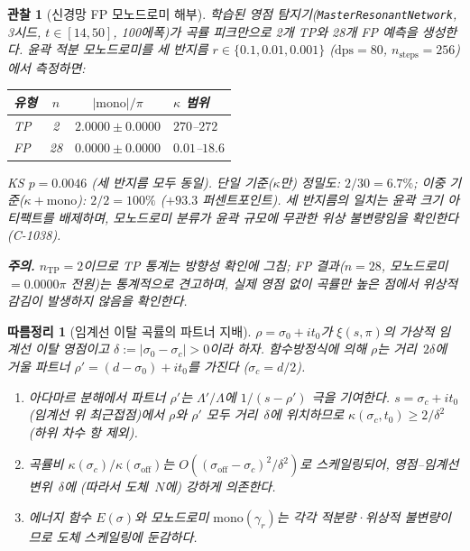 \documentclass[11pt, a4paper]{article}
\theoremstyle{definition}
\theoremstyle{plain}
\newtheorem{corollary}[theorem]{따름정리}
\newtheorem{observation}[theorem]{관찰}
\begin{document}
\begin{observation}[신경망 FP 모노드로미 해부]
\label{obs:nn_fp_mono}
학습된 영점 탐지기(\texttt{MasterResonantNetwork}, 3시드,
$t \in [14,50]$, 100에폭)가 곡률 피크만으로
2개 TP와 28개 FP 예측을 생성한다.
윤곽 적분 모노드로미를 세 반지름
$r \in \{0.1, 0.01, 0.001\}$
($\mathrm{dps}=80$, $n_{\mathrm{steps}} = 256$)에서 측정하면:
\begin{center}
\begin{tabular}{@{}lccl@{}}
\toprule
유형 & $n$ & $|\mathrm{mono}|/\pi$ & $\kappa$ 범위 \\
\midrule
TP & 2 & $2.0000 \pm 0.0000$ & $270$--$272$ \\
FP & 28 & $0.0000 \pm 0.0000$ & $0.01$--$18.6$ \\
\bottomrule
\end{tabular}
\end{center}
KS $p = 0.0046$ (세 반지름 모두 동일).
단일 기준($\kappa$만) 정밀도: $2/30 = 6.7\%$;
이중 기준($\kappa + \mathrm{mono}$): $2/2 = 100\%$
($+93.3$ 퍼센트포인트).
세 반지름의 일치는 윤곽 크기 아티팩트를 배제하며,
모노드로미 분류가 윤곽 규모에 무관한 위상 불변량임을
확인한다 (C-1038).

\smallskip\noindent
\textbf{주의.}\;
$n_{\mathrm{TP}} = 2$이므로 TP 통계는 방향성 확인에 그침;
FP 결과($n = 28$, 모노드로미 $= 0.0000\pi$ 전원)는 통계적으로
견고하며, 실제 영점 없이 곡률만 높은 점에서 위상적 감김이
발생하지 않음을 확인한다.
\end{observation}

\begin{corollary}[임계선 이탈 곡률의 파트너 지배]
\label{cor:partner_dominance}
$\rho = \sigma_0 + it_0$가 $\xi(s,\pi)$의 가상적 임계선 이탈 영점이고
$\delta := |\sigma_0 - \sigma_c| > 0$이라 하자.
함수방정식에 의해 $\rho$는 거리~$2\delta$에 거울 파트너
$\rho' = (d - \sigma_0) + it_0$를 가진다 ($\sigma_c = d/2$).
\begin{enumerate}
  \item[\textup{(i)}]
    아다마르 분해에서 파트너 $\rho'$는 $\Lambda'/\Lambda$에
    $1/(s - \rho')$ 극을 기여한다.
    $s = \sigma_c + it_0$ (임계선 위 최근접점)에서 $\rho$와 $\rho'$
    모두 거리~$\delta$에 위치하므로
    $\kappa(\sigma_c, t_0) \geq 2/\delta^2$ (하위 차수 항 제외).

  \item[\textup{(ii)}]
    곡률비 $\kappa(\sigma_c)/\kappa(\sigma_{\mathrm{off}})$는
    $O((\sigma_{\mathrm{off}} - \sigma_c)^2/\delta^2)$로 스케일링되어,
    영점--임계선 변위~$\delta$에 (따라서 도체~$N$에) 강하게 의존한다.

  \item[\textup{(iii)}]
    에너지 함수 $E(\sigma)$와 모노드로미 $\mathrm{mono}(\gamma_r)$는
    각각 적분량·위상적 불변량이므로 도체 스케일링에 둔감하다.
\end{enumerate}
\end{corollary}
\end{document}
